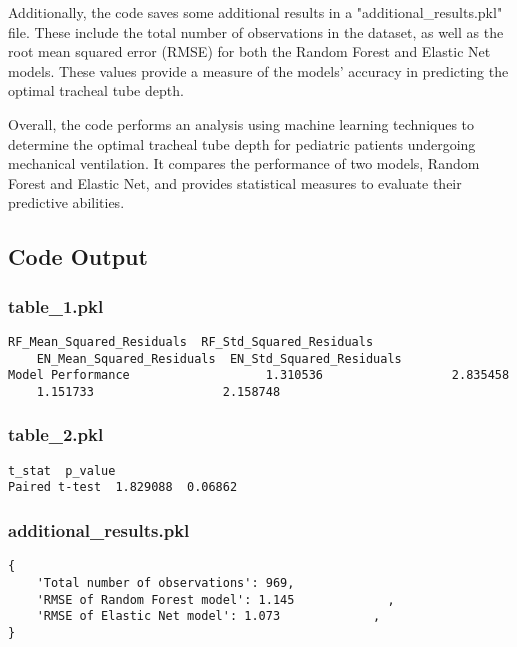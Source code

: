 \documentclass[11pt]{article}
\begin{document}
Additionally, the code saves some additional results in a "additional\_results.pkl" file. These include the total number of observations in the dataset, as well as the root mean squared error (RMSE) for both the Random Forest and Elastic Net models. These values provide a measure of the models' accuracy in predicting the optimal tracheal tube depth.

Overall, the code performs an analysis using machine learning techniques to determine the optimal tracheal tube depth for pediatric patients undergoing mechanical ventilation. It compares the performance of two models, Random Forest and Elastic Net, and provides statistical measures to evaluate their predictive abilities.

\subsection{Code Output}

\subsubsection*{table\_1.pkl}

\begin{Verbatim}[tabsize=4]
                   RF_Mean_Squared_Residuals  RF_Std_Squared_Residuals
	EN_Mean_Squared_Residuals  EN_Std_Squared_Residuals
Model Performance                   1.310536                  2.835458
	1.151733                  2.158748
\end{Verbatim}

\subsubsection*{table\_2.pkl}

\begin{Verbatim}[tabsize=4]
                 t_stat  p_value
Paired t-test  1.829088  0.06862
\end{Verbatim}

\subsubsection*{additional\_results.pkl}

\begin{Verbatim}[tabsize=4]
{
    'Total number of observations': 969,
    'RMSE of Random Forest model': 1.145             ,
    'RMSE of Elastic Net model': 1.073             ,
}
\end{Verbatim}
\end{document}
